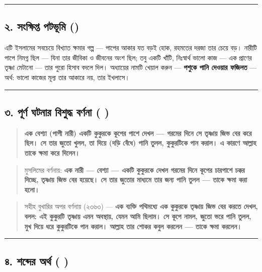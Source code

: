 \medskip\hrule\medskip

\subsection*{২. সংক্ষিপ্ত পটভূমি ()}

এটি ইসলামের সবচেয়ে বিখ্যাত ক্ষমার গল্প — পাপের আকার যত বড়ই হোক, রহমতের দরজা তার চেয়ে বড়। নারীটি পাপে নিমগ্ন ছিল — যিনা তার জীবিকা ও জীবনের অংশ ছিল; তবু একটি খাঁটি, নিঃস্বার্থ ভালো কাজ — এক প্রাণের তৃষ্ণা মেটানো — তার পুরো হিসাব বদলে দিল। অধ্যায়ের নামটি খেয়াল করুন — \textbf{পশুকে পানি দেওয়ার ফজিলত} — অর্থ: ভালো কাজের মূল্য তার আকারে নয়, তার ইখলাসে।

\medskip\hrule\medskip

\subsection*{৩. পূর্ণ ঘটনার বিশুদ্ধ বর্ণনা (  )}

\begin{quote}
\textbf{এক বেশ্যা (পাপী নারী) একটি কুকুরকে কূপের পাশে দেখল — গরমের দিনে সে তৃষ্ণায় জিভ বের করে ছিল। সে তার জুতো খুলল, তা দিয়ে (দড়ি বেঁধে) পানি তুলল, কুকুরটিকে পান করাল। এ কারণে আল্লাহ তাকে ক্ষমা করে দিলেন।}
\end{quote}

\begin{quote}
মুসলিমের বর্ণনায়: \textbf{এক নারী — বেশ্যা — একটি কুকুরকে দেখল গরমের দিনে কূপের চারপাশে চক্কর দিচ্ছে, তৃষ্ণায় জিভ বের হয়েছে। সে তার জুতোর মাধ্যমে তার জন্য পানি তুলল — তাকে ক্ষমা করা হলো।}
\end{quote}

\begin{quote}
সহীহ বুখারির অপর বর্ণনায় (২৩৬৩) — \textbf{এক ব্যক্তি পথিমধ্যে এক কুকুরকে তৃষ্ণায় জিভ বের করতে দেখল, বলল: এই কুকুরটি তৃষ্ণায় এমন অবস্থায়, যেমন আমি ছিলাম। সে কূপে নামল, জুতো ভরে পানি তুলল, মুখ দিয়ে ধরে কুকুরটিকে পান করাল। আল্লাহ তার শোকর কবুল করলেন — তাকে ক্ষমা করলেন।}
\end{quote}

\medskip\hrule\medskip

\subsection*{৪. শব্দের অর্থ ( )}

